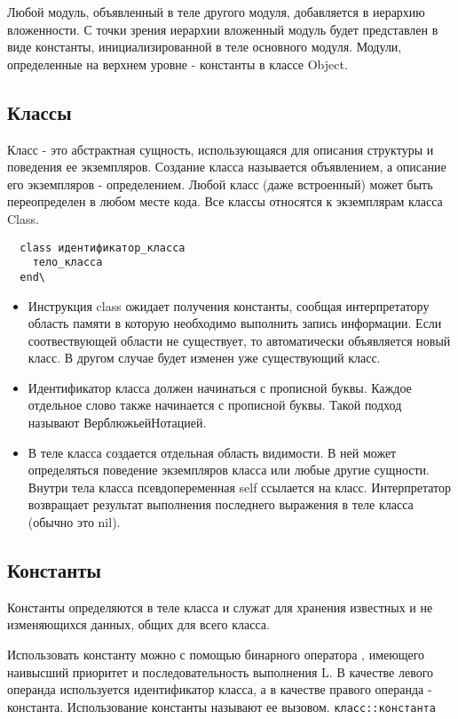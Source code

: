 Любой модуль, объявленный в теле другого модуля, добавляется в иерархию вложенности. С точки зрения иерархии вложенный модуль будет представлен в виде константы, инициализированной в теле основного модуля. Модули, определенные на верхнем уровне - константы в классе Object.

\subsection{Классы}

Класс - это абстрактная сущность, использующаяся для описания структуры и поведения ее экземпляров. Создание класса называется объявлением, а описание его экземпляров - определением. Любой класс (даже встроенный) может быть переопределен в любом месте кода. Все классы относятся к экземплярам класса Class.

\begin{verbatim}
  class идентификатор_класса
    тело_класса
  end\
\end{verbatim}

\begin{itemize}
  \item Инструкция class ожидает получения константы, сообщая интерпретатору область памяти в которую необходимо выполнить запись информации. Если соотвествующей области не существует, то автоматически объявляется новый класс. В другом случае будет изменен уже существующий класс.

  \item Идентификатор класса должен начинаться с прописной буквы. Каждое отдельное слово также начинается с прописной буквы. Такой подход называют ВерблюжьейНотацией.

  \item В теле класса создается отдельная область видимости. В ней может определяться поведение экземпляров класса или любые другие сущности. Внутри тела класса псевдопеременная self ссылается на класс. Интерпретатор возвращает результат выполнения последнего выражения в теле класса (обычно это nil).
\end{itemize}

\subsection{Константы}

Константы определяются в теле класса и служат для хранения известных и не изменяющихся данных, общих для всего класса. 

Использовать константу можно с помощью бинарного оператора \mono{::}, имеющего наивысший приоритет и последовательность выполнения L. В качестве левого операнда используется идентификатор класса, а в качестве правого операнда - константа. Использование константы называют ее вызовом.
\verb!класс::константа!

